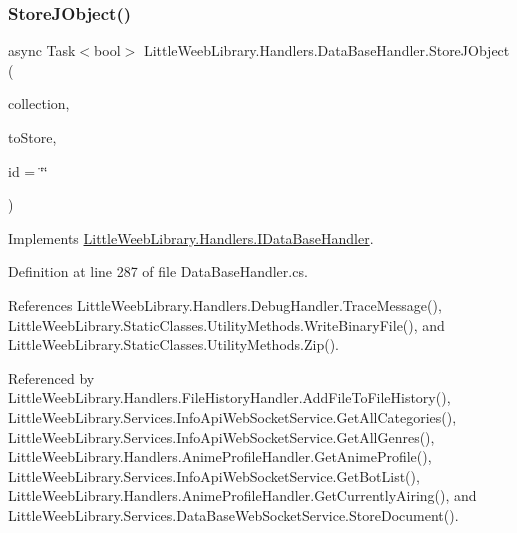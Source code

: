 \mbox{\label{class_little_weeb_library_1_1_handlers_1_1_data_base_handler_a5e6a70ef81b049da46b6ae3a15b09cd3}} 
\subsubsection{\texorpdfstring{Store\+J\+Object()}{StoreJObject()}}
{\footnotesize\ttfamily async Task$<$bool$>$ Little\+Weeb\+Library.\+Handlers.\+Data\+Base\+Handler.\+Store\+J\+Object (\begin{DoxyParamCaption}\item[{string}]{collection,  }\item[{J\+Object}]{to\+Store,  }\item[{string}]{id = {\ttfamily \char`\"{}\char`\"{}} }\end{DoxyParamCaption})}



Implements \mbox{\hyperlink{interface_little_weeb_library_1_1_handlers_1_1_i_data_base_handler_a5d87c42ef7dc7e5d86f7e6fada3454e9}{Little\+Weeb\+Library.\+Handlers.\+I\+Data\+Base\+Handler}}.



Definition at line 287 of file Data\+Base\+Handler.\+cs.



References Little\+Weeb\+Library.\+Handlers.\+Debug\+Handler.\+Trace\+Message(), Little\+Weeb\+Library.\+Static\+Classes.\+Utility\+Methods.\+Write\+Binary\+File(), and Little\+Weeb\+Library.\+Static\+Classes.\+Utility\+Methods.\+Zip().



Referenced by Little\+Weeb\+Library.\+Handlers.\+File\+History\+Handler.\+Add\+File\+To\+File\+History(), Little\+Weeb\+Library.\+Services.\+Info\+Api\+Web\+Socket\+Service.\+Get\+All\+Categories(), Little\+Weeb\+Library.\+Services.\+Info\+Api\+Web\+Socket\+Service.\+Get\+All\+Genres(), Little\+Weeb\+Library.\+Handlers.\+Anime\+Profile\+Handler.\+Get\+Anime\+Profile(), Little\+Weeb\+Library.\+Services.\+Info\+Api\+Web\+Socket\+Service.\+Get\+Bot\+List(), Little\+Weeb\+Library.\+Handlers.\+Anime\+Profile\+Handler.\+Get\+Currently\+Airing(), and Little\+Weeb\+Library.\+Services.\+Data\+Base\+Web\+Socket\+Service.\+Store\+Document().


